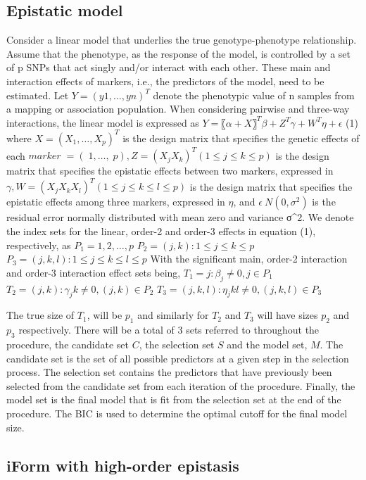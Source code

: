 \documentclass[]{book}
\theoremstyle{definition}
\theoremstyle{definition}
\theoremstyle{remark}
\begin{document}
\subsection{Epistatic model}\label{epistatic-model}

Consider a linear model that underlies the true genotype-phenotype
relationship. Assume that the phenotype, as the response of the model,
is controlled by a set of p SNPs that act singly and/or interact with
each other. These main and interaction effects of markers, i.e., the
predictors of the model, need to be estimated. Let \(Y = (y1, …, yn)^T\)
denote the phenotypic value of n samples from a mapping or association
population. When considering pairwise and three-way interactions, the
linear model is expressed as \(Y=〖α+X〗^T β+Z^T γ+W^T η+ϵ\) (1) where
\(X=(X_1,…,X_p )^T\) is the design matrix that specifies the genetic
effects of each \(marker  = (1, …, p) , Z=(X_j X_k )^T (1≤j≤k≤p)\) is
the design matrix that specifies the epistatic effects between two
markers, expressed in \(γ, W=(X_j X_k X_l )^T (1≤j≤k≤l≤p)\) is the
design matrix that specifies the epistatic effects among three markers,
expressed in \(η\), and \(ϵ~N(0,σ^2 )\) is the residual error normally
distributed with mean zero and variance σ\^{}2. We denote the index sets
for the linear, order-2 and order-3 effects in equation (1),
respectively, as \(P_1={1,2,…,p}\) \(P_2={(j,k):1≤j≤k≤p}\)
\(P_3={(j,k,l):1≤j≤k≤l≤p}\) With the significant main, order-2
interaction and order-3 interaction effect sets being,
\(T_1={j:β_j≠0,j∈P_1 }\) \(T_2={(j,k):γ_jk≠0,(j,k)∈P_2 }\)
\(T_3={(j,k,l):η_jkl≠0,(j,k,l)∈P_3 }\)

The true size of \(T_1\), will be \(p_1\) and similarly for \(T_2\) and
\(T_3\) will have sizes \(p_2\) and \(p_3\) respectively. There will be
a total of 3 sets referred to throughout the procedure, the candidate
set \(C\), the selection set \(S\) and the model set, \(M\). The
candidate set is the set of all possible predictors at a given step in
the selection process. The selection set contains the predictors that
have previously been selected from the candidate set from each iteration
of the procedure. Finally, the model set is the final model that is fit
from the selection set at the end of the procedure. The BIC is used to
determine the optimal cutoff for the final model size.

\subsection{iForm with high-order
epistasis}\label{iform-with-high-order-epistasis}
\end{document}
